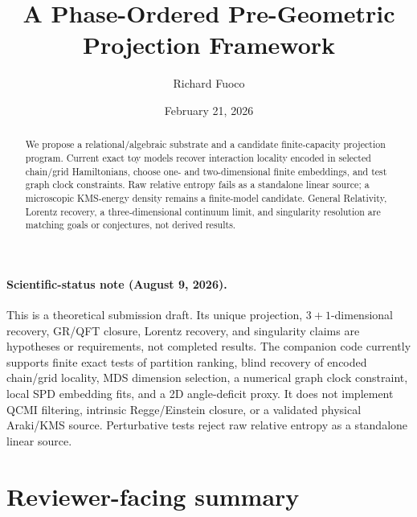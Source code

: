 \documentclass[reprint, amsmath, amssymb, aps, prd]{revtex4-2}
\begin{document}
\title{A Phase-Ordered Pre-Geometric Projection Framework}
\author{Richard Fuoco}
\date{February 21, 2026}

\begin{abstract}
We propose a relational/algebraic substrate and a candidate finite-capacity projection program. Current exact toy models recover interaction locality encoded in selected chain/grid Hamiltonians, choose one- and two-dimensional finite embeddings, and test graph clock constraints. Raw relative entropy fails as a standalone linear source; a microscopic KMS-energy density remains a finite-model candidate. General Relativity, Lorentz recovery, a three-dimensional continuum limit, and singularity resolution are matching goals or conjectures, not derived results.
\end{abstract}

\maketitle

\paragraph{Scientific-status note (August 9, 2026).}
This is a theoretical submission draft. Its unique projection,
$3+1$-dimensional recovery, GR/QFT closure, Lorentz recovery, and singularity
claims are hypotheses or requirements, not completed results. The companion
code currently supports finite exact tests of partition ranking, blind recovery
of encoded chain/grid locality, MDS dimension selection, a numerical graph
clock constraint, local SPD embedding fits, and a 2D angle-deficit proxy. It
does not implement QCMI filtering, intrinsic Regge/Einstein closure, or a
validated physical Araki/KMS source. Perturbative tests reject
raw relative entropy as a standalone linear source.

\section{Reviewer-facing summary}
\end{document}
